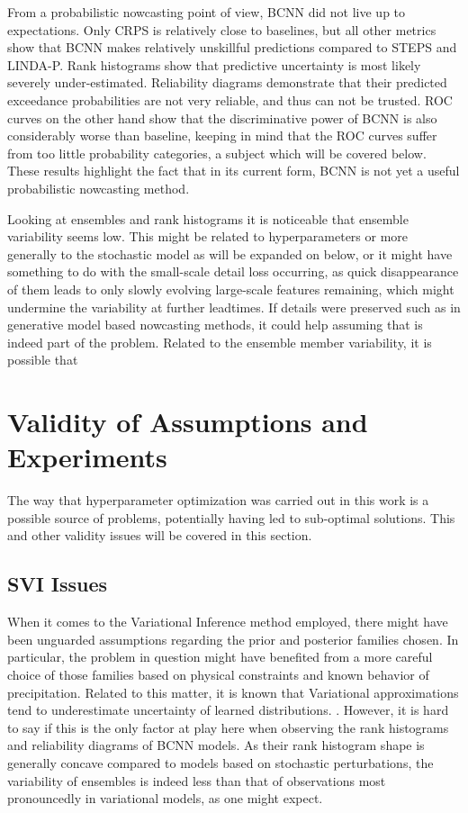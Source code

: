 From a probabilistic nowcasting point of view, BCNN did not live up to expectations. Only CRPS is relatively close to baselines, but all other metrics show that BCNN makes relatively unskillful predictions compared to STEPS and LINDA-P. Rank histograms show that predictive uncertainty is most likely severely under-estimated. Reliability diagrams demonstrate that their predicted exceedance probabilities are not very reliable, and thus can not be trusted. ROC curves on the other hand show that the discriminative power of BCNN is also considerably worse than baseline, keeping in mind that the ROC curves suffer from too little probability categories, a subject which will be covered below. These results highlight the fact that in its current form, BCNN is not yet a useful probabilistic nowcasting method.

Looking at ensembles and rank histograms it is noticeable that ensemble variability seems low. This might be related to hyperparameters or more generally to the stochastic model as will be expanded on below, or it might have something to do with the small-scale detail loss occurring, as quick disappearance of them leads to only slowly evolving large-scale features remaining, which might undermine the variability at further leadtimes. If details were preserved such as in generative model based nowcasting methods, it could help assuming that is indeed part of the problem. Related to the ensemble member variability, it is possible that 


\section{Validity of Assumptions and Experiments}

The way that hyperparameter optimization was carried out in this work is a possible source of problems, potentially having led to sub-optimal solutions. This and other validity issues will be covered in this section.

\subsection{SVI Issues}

When it comes to the Variational Inference method employed, there might have been unguarded assumptions regarding the prior and posterior families chosen. In particular, the problem in question might have benefited from a more careful choice of those families based on physical constraints and known behavior of precipitation.   
Related to this matter, it is known that Variational approximations tend to underestimate uncertainty of learned distributions. \cite{bishop2006pattern, minka_family_nodate}. However, it is hard to say if this is the only factor at play here when observing the rank histograms and reliability diagrams of BCNN models. As their rank histogram shape is generally concave compared to models based on stochastic perturbations, the variability of ensembles is indeed less than that of observations most pronouncedly in variational models, as one might expect. 

